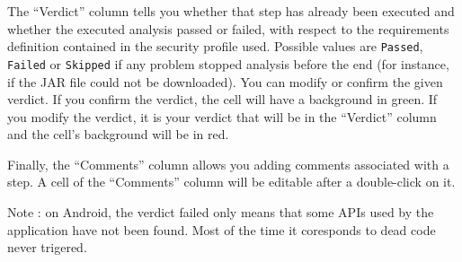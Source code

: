 
The ``Verdict'' column tells you whether that step has already been executed and
whether the executed analysis passed or failed, with respect to the requirements
definition contained in the security profile used.
Possible values are \texttt{Passed}, \texttt{Failed} or \texttt{Skipped} if any
problem stopped analysis before the end (for instance, if the JAR file could not
be downloaded). You can modify or confirm the given verdict. If you confirm the
verdict, the cell will have a background in green. If you modify the verdict, it
is your verdict that will be in the ``Verdict'' column and the cell's background
will be in red.

Finally, the ``Comments'' column allows you adding comments associated with a
step. A cell of the ``Comments'' column will be editable after a double-click
on it.

Note : on Android, the verdict failed only means that some APIs used by the
application have not been found. Most of the time it coresponds to dead code
never trigered.


